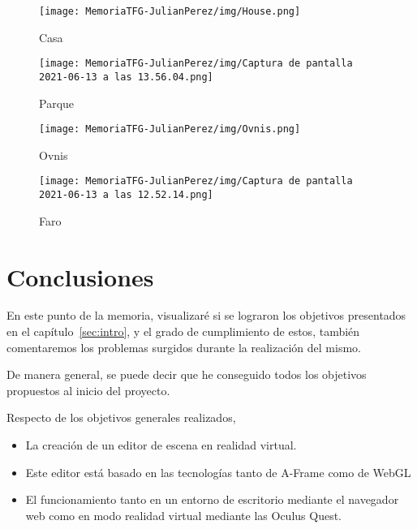 \documentclass[a4paper, 12pt]{book}
\begin{document}
\begin{figure}[H]
  \centering
  \begin{minipage}[b]{0.4\textwidth}
 \texttt{[image: MemoriaTFG-JulianPerez/img/House.png]}
  \caption{Casa}\label{single}
  \end{minipage}
  \hfill
  \begin{minipage}[b]{0.4\textwidth}
  \texttt{[image: MemoriaTFG-JulianPerez/img/Captura de pantalla 2021-06-13 a las 13.56.04.png]}
  \caption{Parque}\label{scrum}
  \end{minipage}
\end{figure}
\begin{figure}[H]
  \centering
  \begin{minipage}[b]{0.4\textwidth}
 \texttt{[image: MemoriaTFG-JulianPerez/img/Ovnis.png]}
  \caption{Ovnis}\label{single}
  \end{minipage}
  \hfill
  \begin{minipage}[b]{0.4\textwidth}
  \texttt{[image: MemoriaTFG-JulianPerez/img/Captura de pantalla 2021-06-13 a las 12.52.14.png]}
  \caption{Faro}\label{scrum}
  \end{minipage}
\end{figure}
\cleardoublepage
\chapter{Conclusiones}
\label{chap:conclusiones}
En este punto de la memoria, visualizaré si se lograron los objetivos presentados en el capítulo~\ref{sec:intro}, y el grado de cumplimiento de estos, también comentaremos los problemas surgidos durante la realización del mismo.

De manera general, se puede decir que he conseguido todos los objetivos propuestos al inicio del proyecto.

Respecto de los objetivos generales realizados, 

\begin{itemize}
    \item La creación de un editor de escena en realidad virtual.
    \item Este editor está basado en las tecnologías tanto de A-Frame como de WebGL
    \item El funcionamiento tanto en un entorno de escritorio mediante el navegador web como en modo realidad virtual mediante las Oculus Quest.
\end{itemize}
\end{document}
